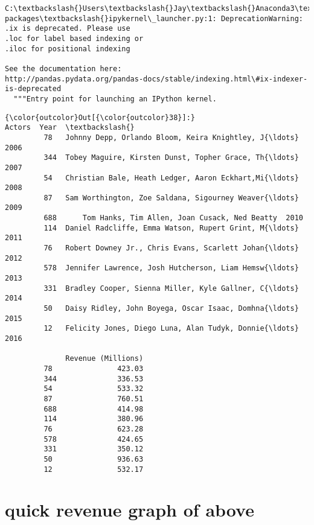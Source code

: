 \documentclass[11pt]{article}
\begin{document}
    \begin{Verbatim}[commandchars=\\\{\}]
C:\textbackslash{}Users\textbackslash{}Jay\textbackslash{}Anaconda3\textbackslash{}lib\textbackslash{}site-packages\textbackslash{}ipykernel\_launcher.py:1: DeprecationWarning: 
.ix is deprecated. Please use
.loc for label based indexing or
.iloc for positional indexing

See the documentation here:
http://pandas.pydata.org/pandas-docs/stable/indexing.html\#ix-indexer-is-deprecated
  """Entry point for launching an IPython kernel.

    \end{Verbatim}

\begin{Verbatim}[commandchars=\\\{\}]
{\color{outcolor}Out[{\color{outcolor}38}]:}                                                 Actors  Year  \textbackslash{}
         78   Johnny Depp, Orlando Bloom, Keira Knightley, J{\ldots}  2006   
         344  Tobey Maguire, Kirsten Dunst, Topher Grace, Th{\ldots}  2007   
         54   Christian Bale, Heath Ledger, Aaron Eckhart,Mi{\ldots}  2008   
         87   Sam Worthington, Zoe Saldana, Sigourney Weaver{\ldots}  2009   
         688      Tom Hanks, Tim Allen, Joan Cusack, Ned Beatty  2010   
         114  Daniel Radcliffe, Emma Watson, Rupert Grint, M{\ldots}  2011   
         76   Robert Downey Jr., Chris Evans, Scarlett Johan{\ldots}  2012   
         578  Jennifer Lawrence, Josh Hutcherson, Liam Hemsw{\ldots}  2013   
         331  Bradley Cooper, Sienna Miller, Kyle Gallner, C{\ldots}  2014   
         50   Daisy Ridley, John Boyega, Oscar Isaac, Domhna{\ldots}  2015   
         12   Felicity Jones, Diego Luna, Alan Tudyk, Donnie{\ldots}  2016   
         
              Revenue (Millions)  
         78               423.03  
         344              336.53  
         54               533.32  
         87               760.51  
         688              414.98  
         114              380.96  
         76               623.28  
         578              424.65  
         331              350.12  
         50               936.63  
         12               532.17  
\end{Verbatim}
            
    \section{quick revenue graph of
above}\label{quick-revenue-graph-of-above}
\end{document}
